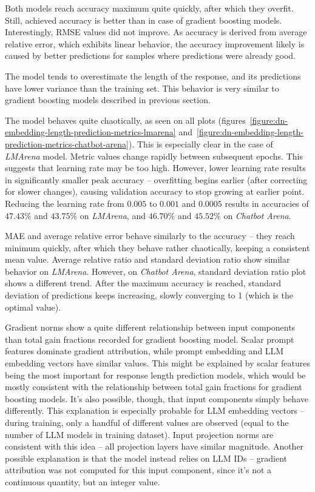 \documentclass[a4paper,11pt,twoside]{report}
\theoremstyle{definition}
\begin{document}
Both models reach accuracy maximum quite quickly, after which they overfit. Still, achieved accuracy is better than in case of gradient boosting models. Interestingly, RMSE values did not improve. As accuracy is derived from average relative error, which exhibits linear behavior, the accuracy improvement likely is caused by better predictions for samples where predictions were already good.

The model tends to overestimate the length of the response, and its predictions have lower variance than the training set. This behavior is very similar to gradient boosting models described in previous section.

The model behaves quite chaotically, as seen on all plots (figures~\ref{figure:dn-embedding-length-prediction-metrics-lmarena} and~\ref{figure:dn-embedding-length-prediction-metrics-chatbot-arena}). This is especially clear in the case of \textit{LMArena} model. Metric values change rapidly between subsequent epochs. This suggests that learning rate may be too high. However, lower learning rate results in significantly smaller peak accuracy -- overfitting begins earlier (after correcting for slower changes), causing validation accuracy to stop growing at earlier point. Reducing the learning rate from $0.005$ to $0.001$ and $0.0005$ results in accuracies of $47.43 \%$ and $43.75 \%$ on \textit{LMArena}, and $46.70 \%$ and $45.52 \%$ on \textit{Chatbot Arena}.

MAE and average relative error behave similarly to the accuracy -- they reach minimum quickly, after which they behave rather chaotically, keeping a consistent mean value. Average relative ratio and standard deviation ratio show similar behavior on \textit{LMArena}. However, on \textit{Chatbot Arena}, standard deviation ratio plot shows a different trend. After the maximum accuracy is reached, standard deviation of predictions keeps increasing, slowly converging to 1 (which is the optimal value).

Gradient norms show a quite different relationship between input components than total gain fractions recorded for gradient boosting model. Scalar prompt features dominate gradient attribution, while prompt embedding and LLM embedding vectors have similar values. This might be explained by scalar features being the most important for response length prediction models, which would be mostly consistent with the relationship between total gain fractions for gradient boosting models. It's also possible, though, that input components simply behave differently. This explanation is especially probable for LLM embedding vectors -- during training, only a handful of different values are observed (equal to the number of LLM models in training dataset). Input projection norms are consistent with this idea -- all projection layers have similar magnitude. Another possible explanation is that the model instead relies on LLM IDs -- gradient attribution was not computed for this input component, since it's not a continuous quantity, but an integer value.
\end{document}
